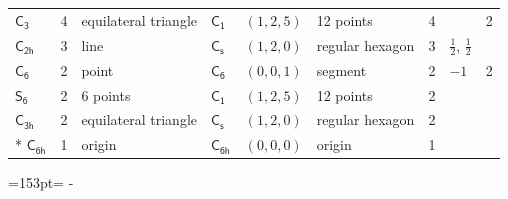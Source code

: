 \documentclass[10pt,a4paper]{article}
\newcommand{\needspace}[1]{\par\penalty-100\begingroup\dimen0=#1\relax\dimen2=\pagegoal
  \advance\dimen2-\pagetotal\ifdim\dimen0>\dimen2\relax\ifdim\dimen2>0pt\vfil\break\fi\fi
  \endgroup}
\numberwithin{equation}{section}
\newcommand{\grp}[1]{\mathsf{#1}}
\newlength{\fillwidth}\newlength{\cellwidth}\newlength{\colwidth}
\begin{document}
{{\begin{longtable}{@{}lrllllr>{\RaggedRight\arraybackslash}p{\fillwidth}r@{}}
\href{C3.pdf}{$\grp{C_{3}}$} & 4 & equilateral triangle & \href{C1.pdf}{$\grp{C_{1}}$} & $(1, 2, 5)$ & 12 points & 4 &  & 2\\
\href{C2h.pdf}{$\grp{C_{2h}}$} & 3 & line & \href{C1v.pdf}{$\grp{C_{s}}$} & $(1, 2, 0)$ & regular hexagon & 3 & ${\tfrac{1}{2}}$, ${\tfrac{1}{2}}$ & \\
\href{C6.pdf}{$\grp{C_{6}}$} & 2 & point & \href{C6.pdf}{$\grp{C_{6}}$} & $(0, 0, 1)$ & segment & 2 & ${-1}$ & 2\\
\href{S6.pdf}{$\grp{S_{6}}$} & 2 & 6 points & \href{C1.pdf}{$\grp{C_{1}}$} & $(1, 2, 5)$ & 12 points & 2 &  & \\
\href{C3h.pdf}{$\grp{C_{3h}}$} & 2 & equilateral triangle & \href{C1v.pdf}{$\grp{C_{s}}$} & $(1, 2, 0)$ & regular hexagon & 2 &  & \\*
\href{C6h.pdf}{$\grp{C_{6h}}$} & 1 & origin & \href{C6h.pdf}{$\grp{C_{6h}}$} & $(0, 0, 0)$ & origin & 1 &  & \\
\bottomrule\end{longtable}}}
\needspace{153pt}
\end{document}
